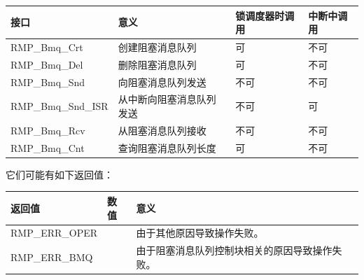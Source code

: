 {\def\LTcaptype{none} %
\begin{longtable}[]{@{}
  >{\raggedright\arraybackslash}p{}
  >{\raggedright\arraybackslash}p{}
  >{\raggedright\arraybackslash}p{}
  >{\raggedright\arraybackslash}p{}@{}}
\toprule\noalign{}
\begin{minipage}[b]{\linewidth}\raggedright
接口
\end{minipage} & \begin{minipage}[b]{\linewidth}\raggedright
意义
\end{minipage} & \begin{minipage}[b]{\linewidth}\raggedright
锁调度器时调用
\end{minipage} & \begin{minipage}[b]{\linewidth}\raggedright
中断中调用
\end{minipage} \\
\midrule\noalign{}
\endhead
\bottomrule\noalign{}
\endlastfoot
RMP\_Bmq\_Crt & 创建阻塞消息队列 & 可 & 不可 \\
RMP\_Bmq\_Del & 删除阻塞消息队列 & 可 & 不可 \\
RMP\_Bmq\_Snd & 向阻塞消息队列发送 & 不可 & 不可 \\
RMP\_Bmq\_Snd\_ISR & 从中断向阻塞消息队列发送 & 不可 & 可 \\
RMP\_Bmq\_Rcv & 从阻塞消息队列接收 & 不可 & 不可 \\
RMP\_Bmq\_Cnt & 查询阻塞消息队列长度 & 可 & 不可 \\
\end{longtable}
}

它们可能有如下返回值：

\label{tab:possible-return-values-of-the-blocking-message-queue-extension-interface}

{\def\LTcaptype{none} %
\begin{longtable}[]{@{}
  >{\raggedright\arraybackslash}p{}
  >{\raggedright\arraybackslash}p{}
  >{\raggedright\arraybackslash}p{}@{}}
\toprule\noalign{}
\begin{minipage}[b]{\linewidth}\raggedright
返回值
\end{minipage} & \begin{minipage}[b]{\linewidth}\raggedright
数值
\end{minipage} & \begin{minipage}[b]{\linewidth}\raggedright
意义
\end{minipage} \\
\midrule\noalign{}
\endhead
\bottomrule\noalign{}
\endlastfoot
RMP\_ERR\_OPER & -6 & 由于其他原因导致操作失败。 \\
RMP\_ERR\_BMQ & -11 & 由于阻塞消息队列控制块相关的原因导致操作失败。 \\
\end{longtable}
}


